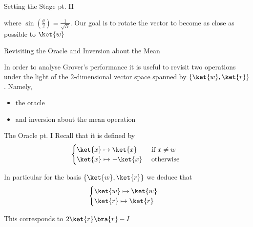 \documentclass{beamer}
\begin{document}
\begin{frame}{Setting the Stage pt. II}

        \begin{center}
        \end{center}

        where $\sin(\frac{\theta}{2}) = \frac{1}{\sqrt{N}}$. Our goal is to rotate
        the vector to become \alert{as close as possible} to $\ket{w}$

\end{frame}


\begin{frame}{Revisiting the Oracle and Inversion about the Mean}

       In order to analyse Grover's performance it is useful to revisit two
       operations under the light of the $2$-dimensional vector space spanned
       by $\{\ket{w},\ket{r}\}$. Namely,
       \begin{itemize}
               \item the oracle
               \item and inversion about the mean operation
       \end{itemize}
       
\end{frame}

\begin{frame}{The Oracle pt. I}
        Recall that it is defined by
        \[
                \begin{cases}
                        \ket{x} \mapsto \ket{x} & \text{ if } x \not = w \\
                        \ket{x} \mapsto - \ket{x} & \text{ otherwise }
                \end{cases}
        \]

        In particular for the basis $\{\ket{w},\ket{r}\}$ we deduce that 
        \[
                \begin{cases}
                        \ket{w} \mapsto \ket{w} \\
                        \ket{r} \mapsto \ket{r}
                \end{cases}
        \]

        This corresponds to \alert{$2\ket{r}\bra{r} - I$}
\end{frame}
\end{document}
